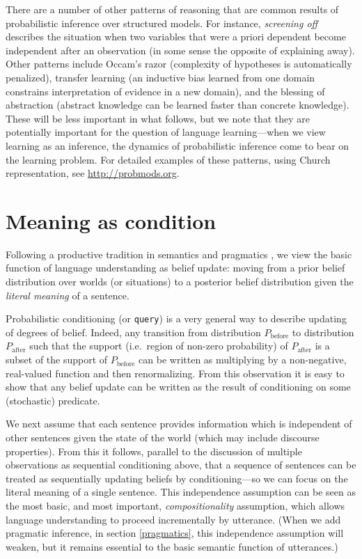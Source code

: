 \documentclass[pdfextras]{handbook}
\begin{document}
There are a number of other patterns of reasoning that are common results of probabilistic inference over structured models. 
For instance, \emph{screening off} describes the situation when two variables that were a priori dependent become independent after an observation (in some sense the opposite of explaining away).
Other patterns include Occam's razor (complexity of hypotheses is automatically penalized), transfer learning (an inductive bias learned from one domain constrains interpretation of evidence in a new domain), and the blessing of abstraction (abstract knowledge can be learned faster than concrete knowledge). 
These will be less important in what follows, but we note that they are potentially important for the question of language learning---when we view learning as an inference, the dynamics of probabilistic inference come to bear on the learning problem. For detailed examples of these patterns, using Church representation, see \url{http://probmods.org}.

 
\section{Meaning as condition}
\label{literal}
\label{literal-listener}

Following a productive tradition in semantics and pragmatics \citep[][etc.]{stalnaker78,lewis79,heim82}, we view the basic function of language understanding as belief update: moving from a prior belief distribution over worlds (or situations) to a posterior belief distribution given the \emph{literal meaning} of a sentence. 

Probabilistic conditioning (or \lstinline{query}) is a very general way to describe updating of degrees of belief. Indeed, any transition from distribution $P_{\text{before}}$ to distribution $P_{\text{after}}$ such that the support (i.e.\ region of non-zero probability) of $P_{\text{after}}$ is a subset of the support of $P_{\text{before}}$ can be written as multiplying by a non-negative, real-valued function and then renormalizing. From this observation it is easy to show that any belief update can be written as the result of conditioning on some (stochastic) predicate.

We next assume that each sentence provides information which is independent of other sentences given the state of the world (which may include discourse properties). From this it follows, parallel to the discussion of multiple observations as sequential conditioning above, that a sequence of sentences can be treated as sequentially updating beliefs by conditioning---so we can focus on the literal meaning of a single sentence. This independence assumption can be seen as the most basic, and most important, \emph{compositionality} assumption, which allows language understanding to proceed incrementally by utterance. (When we add pragmatic inference, in section \ref{pragmatics}, this independence assumption will weaken, but it remains essential to the basic semantic function of utterances.)
\end{document}
